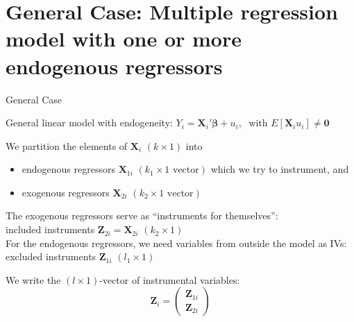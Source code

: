 \documentclass[9pt,aspectratio=169, xcolor=dvipsnames]{beamer}
\begin{document}
\section{General Case: Multiple regression model with one or more endogenous regressors}

\begin{frame}{General Case}
\linespread{1.3}\selectfont %

General linear model with endogeneity:
$Y_i = \boldsymbol{X}_i'\boldsymbol{\beta} + u_i,\; \text{ with } E[\boldsymbol{X}_i u_i] \neq \boldsymbol{0}$

We partition the elements of $\boldsymbol{X}_i$ {\color{gray}$(k \times 1)$} into
\begin{itemize}
    \item endogenous regressors $\boldsymbol{X}_{1i}$ {\color{gray}$(k_1 \times 1\text{ vector})$} which we try to instrument, and
    \item exogenous regressors $\boldsymbol{X}_{2i}$ {\color{gray}$(k_2 \times 1\text{ vector})$}
\end{itemize}

\vspace{0.15cm}
The exogenous regressors serve as ``instruments for themselves'': \\
\hspace{0.25cm}\alert{included instruments} $\boldsymbol{Z}_{2i} = \boldsymbol{X}_{2i}$ {\color{gray}$(k_2 \times 1)$} \\[0.1cm]
For the endogenous regressors, we need variables from outside the model as IVs: \\
\hspace{0.25cm}\alert{excluded instruments} $\boldsymbol{Z}_{1i}$ {\color{gray}$(l_1 \times 1)$}

\vspace{0.15cm}
We write the {\color{gray}$(l \times 1)$}-vector of instrumental variables:
\[
\boldsymbol{Z}_i = 
\begin{pmatrix}
    \boldsymbol{Z}_{1i} \\
    \boldsymbol{Z}_{2i}
\end{pmatrix}
\]

\end{frame}
\end{document}
